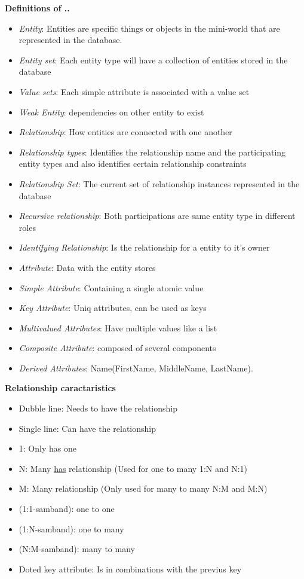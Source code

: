 \begin{multicols}{2}
\noindent\textbf{Definitions of ..}
\begin{itemize}
    \item \textit{Entity}: Entities are specific things or objects in the 
    mini-world that are represented in the database.
    \item \textit{Entity set}: Each entity type will have a collection of entities stored in the database
    \item \textit{Value sets}: Each simple attribute is associated with a value set
    \item \textit{Weak Entity}: dependencies on other entity to exist
    \item \textit{Relationship}: How entities are connected with one another
    \item \textit{Relationship types}: Identifies the relationship name and the participating entity types and also identifies certain relationship constraints
    \item \textit{Relationship Set}: The current set of relationship instances represented in the database
    \item \textit{Recursive relationship}: Both participations are same entity type in different roles
    \item \textit{Identifying Relationship}: Is the relationship for a entity to it's owner
    \item \textit{Attribute}: Data with the entity stores
    \item \textit{Simple Attribute}: Containing a single atomic value
    \item \textit{Key Attribute}: Uniq attributes, can be used as keys
    \item \textit{Multivalued Attributes}: Have multiple values like a list
    \item \textit{Composite Attribute}: composed of several components
    \item \textit{Derived Attributes}: Name(FirstName, MiddleName, LastName).
\end{itemize}


\noindent\textbf{Relationship caractaristics}
\begin{itemize}
    \item Dubble line: Needs to have the relationship
    \item Single line: Can have the relationship
    \item 1: Only has one
    \item N: Many \underline{has} relationship (Used for one to many 1:N and N:1)
    \item M: Many relationship (Only used for many to many N:M and M:N)
    \item (1:1-samband): one to one
    \item (1:N-samband): one to many
    \item (N:M-samband): many to many 
    \item Doted key attribute: Is in combinations with the previus key
\end{itemize}


\end{multicols}
